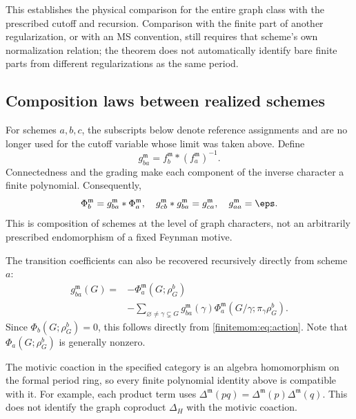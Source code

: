 \documentclass[11pt,a4paper,oneside]{article}
\theoremstyle{plain}
\theoremstyle{definition}
\theoremstyle{remark}
\numberwithin{equation}{section}
\begin{document}
This establishes the physical comparison for the entire graph class with the prescribed cutoff and recursion.
Comparison with the finite part of another regularization, or with an MS convention, still requires that scheme's own normalization relation; the theorem does not automatically identify bare finite parts from different regularizations as the same period.


\subsection{Composition laws between realized schemes}
For schemes $a,b,c$, the subscripts below denote reference assignments and are no longer used for the cutoff variable whose limit was taken above.
Define
\begin{equation}\label{finitemom:eq:transition}
 g_{ba}^{\mathfrak m}=f_b^{\mathfrak m}*(f_a^{\mathfrak m})^{-1}.
\end{equation}
Connectedness and the grading make each component of the inverse character a finite polynomial.
Consequently,
\begin{equation}\label{finitemom:eq:cocycle}
 \Phi_b^{\mathfrak m}=g_{ba}^{\mathfrak m}*\Phi_a^{\mathfrak m},
 \quad g_{cb}^{\mathfrak m}*g_{ba}^{\mathfrak m}=g_{ca}^{\mathfrak m},
 \quad g_{aa}^{\mathfrak m}=\eps.
\end{equation}
This is composition of schemes at the level of graph characters, not an arbitrarily prescribed endomorphism of a fixed Feynman motive.

The transition coefficients can also be recovered recursively directly from scheme $a$:
\begin{align}\label{finitemom:eq:directtransition}
 g_{ba}^{\mathfrak m}(G)={}&-\Phi_a^{\mathfrak m}(G;\rho_G^b)\nonumber\\
 &-\sum_{\varnothing\ne\gamma\subsetneq G}
 g_{ba}^{\mathfrak m}(\gamma)
 \Phi_a^{\mathfrak m}(G/\gamma;\pi_\gamma\rho_G^b).
\end{align}
Since $\Phi_b(G;\rho_G^b)=0$, this follows directly from \eqref{finitemom:eq:action}.
Note that $\Phi_a(G;\rho_G^b)$ is generally nonzero.

The motivic coaction in the specified category is an algebra homomorphism on the formal period ring, so every finite polynomial identity above is compatible with it.
For example, each product term uses $\Delta^{\mathfrak m}(pq)=\Delta^{\mathfrak m}(p)\Delta^{\mathfrak m}(q)$.
This does not identify the graph coproduct $\Delta_H$ with the motivic coaction.
\end{document}
